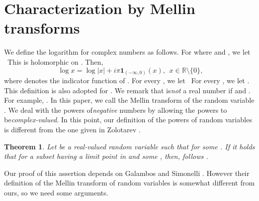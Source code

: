 \documentclass{amsart}
\newtheorem{Thm}{Theorem}
\theoremstyle{definition}
\begin{document}
\section{Characterization by Mellin transforms}
We define the logarithm for complex numbers as follows.
For   where   and  ,
we let
\ This is holomorphic on  .
Then,
\begin{equation}\label{def-log}
\log x = \log |x| + i \pi \mathbf{1}_{(-\infty, 0)}(x), \ \ x \in \mathbb{R} \setminus \{0\},
\end{equation}
where   denotes the indicator function of  .
For every  , we let
\ For every  , we let  .
This definition is also adopted for  .
We remark that   is{\it not} a real number if   and  .
For example,  .
In this paper, we call   the Mellin transform of the random variable  .
We deal with the powers of{\it negative} numbers by allowing the powers to be{\it complex-valued}.
In this point, our definition of
the powers of
random variables
is different from the one given in Zolotarev \cite{Zolotarev1986}.
\begin{Thm}\label{power}
Let   be a real-valued random variable such that  
for some  .
If it holds that   for
a subset   having a limit point in   and some  ,
then,   follows
 .
\end{Thm}
Our proof of this assertion depends on Galambos and Simonelli \cite{galambos2004}.
However their definition of
the Mellin transform of random variables is somewhat different from ours, so we need some arguments.
\end{document}
